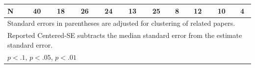 \begin{table}[htbp]
\begin{tabular}{l*{10}{c}}
\hline
N           &          40         &          18         &          26         &          24         &          13         &          25         &           8         &          12         &          10         &           4         \\
\hline\hline
\multicolumn{11}{l}{\footnotesize Standard errors in parentheses are adjusted for clustering of related papers.}\\
\multicolumn{11}{l}{\footnotesize Reported Centered-SE subtracts the median standard error from the estimate standard error.}\\
\multicolumn{11}{l}{\footnotesize \footnotesize \sym{*} \(p<.1\), \sym{**} \(p<.05\), \sym{***} \(p<.01\)}\\
\end{tabular}
\end{table}
